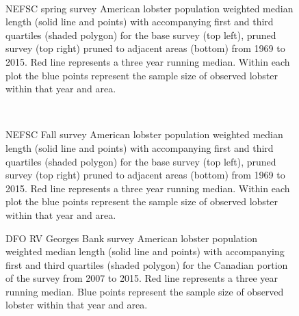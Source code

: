 \documentclass[11pt]{article}
\newcommand{\D}{.}
\newcommand{\e}{/backup/bio_data/bio.lobster/figures/} %
\begin{document}
\begin{figure}
\centering
{}\\
\caption{NEFSC spring survey American lobster population weighted median length (solid line and points) with accompanying first and third quartiles (shaded polygon) for the base survey (top left), pruned survey (top right) pruned to adjacent areas (bottom) from 1969 to 2015. Red line represents a three year running median. Within each plot the blue points represent the sample size of observed lobster within that year and area. }
\end{figure}
\clearpage



\begin{figure}
\centering
{}\\
\caption{NEFSC Fall survey American lobster population weighted median length (solid line and points) with accompanying first and third quartiles (shaded polygon) for the base survey (top left), pruned survey (top right) pruned to adjacent areas (bottom) from 1969 to 2015. Red line represents a three year running median. Within each plot the blue points represent the sample size of observed lobster within that year and area. }
\end{figure}
\clearpage


\begin{figure}

    \caption{DFO RV Georges Bank survey American lobster population weighted median length (solid line and points) with accompanying first and third quartiles (shaded polygon) for the Canadian portion of the survey from 2007 to 2015. Red line represents a three year running median. Blue points represent the sample size of observed lobster within that year and area.}

\end{figure}
\end{document}
